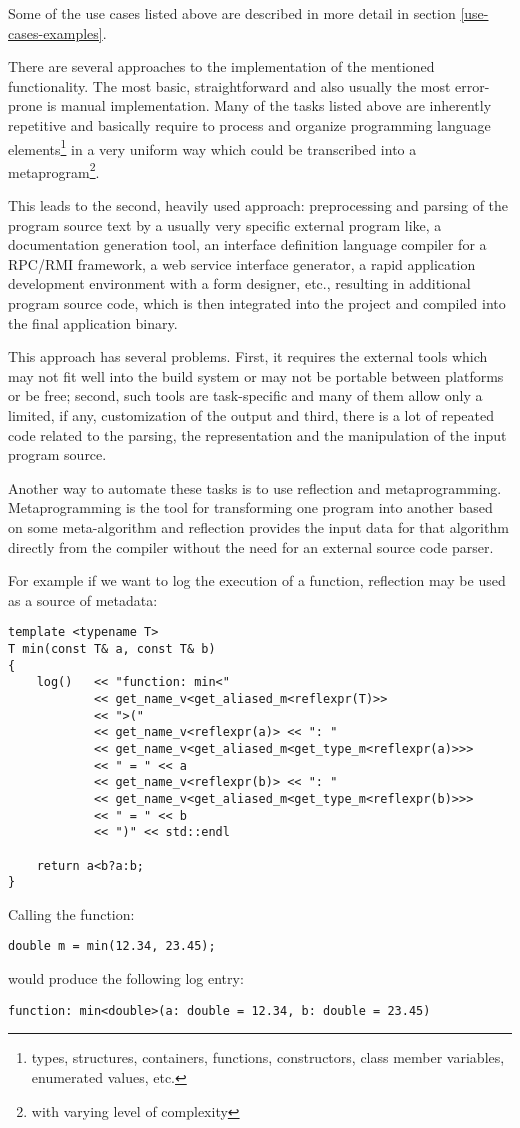 Some of the use cases listed above are described in more detail in section
\ref{use-cases-examples}.

There are several approaches to the implementation of the mentioned functionality.
The most basic, straightforward and also usually the most
error-prone is manual implementation. Many of the tasks listed above
are inherently repetitive and basically require to process and organize
programming language elements\footnote{types, structures, containers, functions,
constructors, class member variables, enumerated values, etc.}
in a very uniform way which could be transcribed into a metaprogram\footnote{with
varying level of complexity}.

This leads to the second, heavily used approach: preprocessing
and parsing of the program source text by a usually very specific external
program like, a documentation generation tool, an interface definition language
compiler for a RPC/RMI framework, a web service interface generator,
a rapid application development environment with a form designer, etc.,
resulting in additional program source code, which is then integrated into
the project and compiled into the final application binary.

This approach has several problems. First, it requires the external
tools which may not fit well into the build system or may not be portable
between platforms or be free; second, such tools are task-specific
and many of them allow only a limited, if any, customization of the output
and third, there is a lot of repeated code related to the parsing, the
representation and the manipulation of the input program source.

Another way to automate these tasks is to use reflection and metaprogramming.
Metaprogramming is the tool for transforming one program into another based
on some meta-algorithm and reflection provides the input data for that algorithm
directly from the compiler without the need for an external source code parser.

For example if we want to log the execution of a function, reflection may
be used as a source of metadata:

\begin{verbatim}
template <typename T>
T min(const T& a, const T& b)
{
	log()   << "function: min<"
	        << get_name_v<get_aliased_m<reflexpr(T)>>
	        << ">("
	        << get_name_v<reflexpr(a)> << ": "
	        << get_name_v<get_aliased_m<get_type_m<reflexpr(a)>>>
	        << " = " << a
	        << get_name_v<reflexpr(b)> << ": "
	        << get_name_v<get_aliased_m<get_type_m<reflexpr(b)>>>
	        << " = " << b
	        << ")" << std::endl

	return a<b?a:b;
}
\end{verbatim}

Calling the \verb@min@ function:

\begin{verbatim}
double m = min(12.34, 23.45);
\end{verbatim}

would produce the following log entry:

\begin{verbatim}
function: min<double>(a: double = 12.34, b: double = 23.45)
\end{verbatim}

